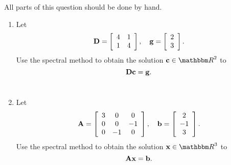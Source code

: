 
All parts of this question should be done by hand.

\begin{enumerate} 
\item Let
\[
{\bf D}=\left[\begin{array}{cc}4&1\\1&4\end{array}\right], \quad {\bf g}=\left[\begin{array}{c}2\\3\end{array}\right].
\]
Use the spectral method to obtain the solution $\Bc\in\R^2$ to
\[
{\bf D}{\bf c}={\bf g}.
\]
\\
\item Let
\[
{\bf A} = \left[\begin{array}{ccc} 3 & 0 & 0 \\ 0 & 0 & -1 \\ 0 & -1 & 0\end{array}\right], \quad 
{\bf b} = \left[\begin{array}{c} 2 \\ -1 \\ 3\end{array}\right].
\]
Use the spectral method to obtain the solution $\Bx\in\R^3$ to
\[
{\bf A}{\bf x} = {\bf b}.
\]
\end{enumerate}




